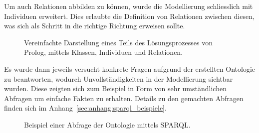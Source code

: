 \newpage

Um auch Relationen abbilden zu können, wurde die Modellierung schliesslich mit Individuen erweitert. Dies erlaubte die Definition von Relationen zwischen diesen, was sich als Schritt in die richtige Richtung erweisen sollte.

\begin{figure}[H]
\centering {}
\caption{Vereinfachte Darstellung eines Teils des Lösungsprozesses von Prolog, mittels Klassen, Individuen und Relationen.\label{fig:prolog_loesungsprozess}\protect\footnotemark}
\end{figure}

Es wurde dann jeweils versucht konkrete Fragen aufgrund der erstellten Ontologie zu beantworten, wodurch Unvollständigkeiten in der Modellierung  sichtbar wurden. Diese zeigten sich zum Beispiel in Form von sehr umständlichen Abfragen um einfache Fakten zu erhalten. Details zu den gemachten Abfragen finden sich im Anhang~\ref{sec:anhang:sparql_beispiele}.

\begin{figure}[H]
\centering {}
\caption{Beispiel einer Abfrage der Ontologie mittels SPARQL.\label{fig:sparql_beispiel}\protect\footnotemark}
\end{figure}

